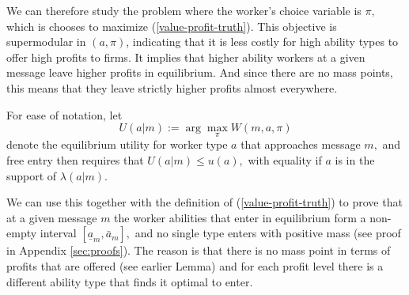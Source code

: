 \documentclass[12pt]{article}
\theoremstyle{plain}
\begin{document}
We can therefore study the problem where the worker's choice variable is $%
\pi ,$ which is chooses to maximize (\ref{value-profit-truth}). This
objective is supermodular in $(a,\pi )$, indicating that it is less costly
for high ability types to offer high profits to firms. It implies that
higher ability workers at a given message leave higher profits in
equilibrium. And since there are no mass points, this means that they leave
strictly higher profits almost everywhere.

For ease of notation, let 
\begin{equation}
U(a|m):=\arg \max_{\pi }W(m,a,\pi )  \label{value-profit-truth2}
\end{equation}%
denote the equilibrium utility for worker type $a$ that approaches message $%
m,$ and free entry then requires that $U(a|m)\leq u(a),$ with equality if $a$
is in the support of $\lambda (a|m).$

We can use this together with the definition of (\ref{value-profit-truth})
to prove that at a given message $m$ the worker abilities that enter in
equilibrium form a non-empty interval $[\underline{a}_{m},\bar{a}_{m}],$ and
no single type enters with positive mass (see proof in Appendix \ref{sec:proofs}). The
reason is that there is no mass point in terms of profits that are offered
(see earlier Lemma) and for each profit level there is a
different ability type that finds it optimal to enter.
\end{document}
